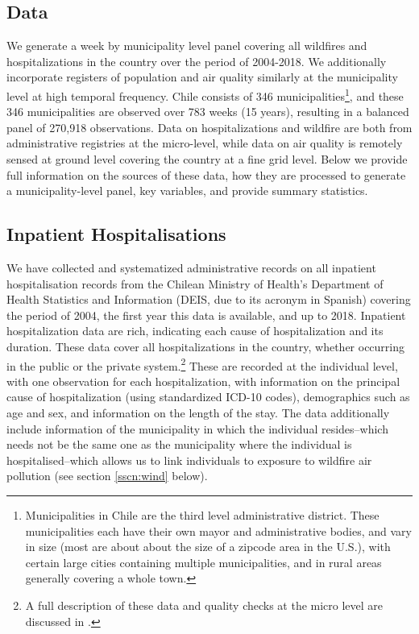 \documentclass[11pt]{article}
\begin{document}
\begin{spacing}{1.5}
\section{Data}
\label{scn:data} 
We generate a week by municipality level panel covering all wildfires and hospitalizations in the country over the period of 2004-2018.  We additionally incorporate registers of population and air quality similarly at the municipality level at high temporal frequency.  Chile consists of 346 municipalities\footnote{Municipalities in Chile are the third level administrative district. These municipalities each have their own mayor and administrative bodies, and vary in size (most are about about the size of a zipcode area in the U.S.), with certain large cities containing multiple municipalities, and in rural areas generally covering a whole town.}, and these 346 municipalities are observed over 783 weeks (15 years), resulting in a balanced panel of 270,918 observations.
Data on hospitalizations and wildfire are both from administrative registries at the micro-level, while data on air quality is remotely sensed at ground level covering the country at a fine grid level.  Below we provide full information on the sources of these data, how they are processed to generate a municipality-level panel, key variables, and provide summary statistics. 

\subsection{Inpatient Hospitalisations}
\label{sscn:hospitalisations} 
We have collected and systematized administrative records on all inpatient hospitalisation records from the Chilean Ministry of Health's Department of Health Statistics and Information (DEIS, due to its acronym in Spanish) covering the period of 2004, the first year this data is available, and up to 2018. Inpatient hospitalization data are rich, indicating each cause of hospitalization and its duration. These data cover all hospitalizations in the country, whether occurring in the public or the private system.\footnote{A full description of these data and quality checks at the micro level are discussed in \citet{Clarkeetal2022}.} These are recorded at the individual level, with one observation for each hospitalization, with information on the principal cause of hospitalization (using standardized ICD-10 codes), demographics such as age and sex, and information on the length of the stay.  The data additionally include information of the municipality in which the individual resides--which needs not be the same one as the municipality where the individual is hospitalised--which allows us to link individuals to exposure to wildfire air pollution (see section \ref{sscn:wind} below). 


\end{spacing}
\end{document}
